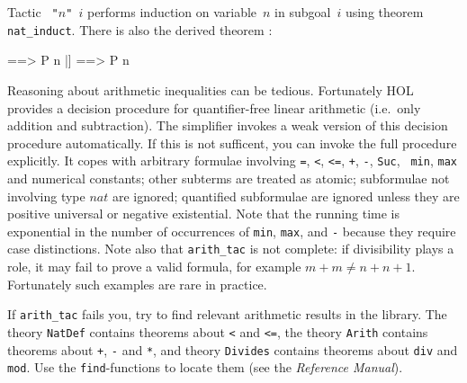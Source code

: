 
Tactic {\tt{} "$n$" $i$} performs induction on variable~$n$
in subgoal~$i$ using theorem \texttt{nat_induct}.  There is also the derived
theorem :
\begin{ttbox}
[| !!n. [| ! m. m<n --> P m |] ==> P n |]  ==>  P n
\end{ttbox}


Reasoning about arithmetic inequalities can be tedious.  Fortunately HOL
provides a decision procedure for quantifier-free linear arithmetic (i.e.\ 
only addition and subtraction). The simplifier invokes a weak version of this
decision procedure automatically. If this is not sufficent, you can invoke
the full procedure \ttindex{arith_tac} explicitly.  It copes with arbitrary
formulae involving {\tt=}, {\tt<}, {\tt<=}, {\tt+}, {\tt-}, {\tt Suc}, {\tt
  min}, {\tt max} and numerical constants; other subterms are treated as
atomic; subformulae not involving type $nat$ are ignored; quantified
subformulae are ignored unless they are positive universal or negative
existential. Note that the running time is exponential in the number of
occurrences of {\tt min}, {\tt max}, and {\tt-} because they require case
distinctions. Note also that \texttt{arith_tac} is not complete: if
divisibility plays a role, it may fail to prove a valid formula, for example
$m+m \neq n+n+1$. Fortunately such examples are rare in practice.

If \texttt{arith_tac} fails you, try to find relevant arithmetic results in
the library.  The theory \texttt{NatDef} contains theorems about {\tt<} and
{\tt<=}, the theory \texttt{Arith} contains theorems about \texttt{+},
\texttt{-} and \texttt{*}, and theory \texttt{Divides} contains theorems about
\texttt{div} and \texttt{mod}.  Use the \texttt{find}-functions to locate them
(see the {\em Reference Manual\/}).

